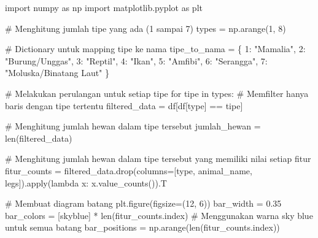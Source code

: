 \documentclass[
  letterpaper,
]{krantz}
\makeatletter
\newenvironment{Shaded}{\begin{snugshade}}{\end{snugshade}}
\newcommand{\BuiltInTok}[1]{\textcolor[rgb]{0.00,0.23,0.31}{#1}}
\newcommand{\CommentTok}[1]{\textcolor[rgb]{0.37,0.37,0.37}{#1}}
\newcommand{\ControlFlowTok}[1]{\textcolor[rgb]{0.00,0.23,0.31}{#1}}
\newcommand{\DecValTok}[1]{\textcolor[rgb]{0.68,0.00,0.00}{#1}}
\newcommand{\FloatTok}[1]{\textcolor[rgb]{0.68,0.00,0.00}{#1}}
\newcommand{\ImportTok}[1]{\textcolor[rgb]{0.00,0.46,0.62}{#1}}
\newcommand{\KeywordTok}[1]{\textcolor[rgb]{0.00,0.23,0.31}{#1}}
\newcommand{\NormalTok}[1]{\textcolor[rgb]{0.00,0.23,0.31}{#1}}
\newcommand{\OperatorTok}[1]{\textcolor[rgb]{0.37,0.37,0.37}{#1}}
\newcommand{\StringTok}[1]{\textcolor[rgb]{0.13,0.47,0.30}{#1}}
\newenvironment{kframe}{%
\medskip{}
\setlength{\fboxsep}{.8em}
 \def\at@end@of@kframe{}%
 \ifinner\ifhmode%
  \def\at@end@of@kframe{\end{minipage}}%
  \begin{minipage}{\columnwidth}%
 \fi\fi%
 \def\FrameCommand##1{\hskip\@totalleftmargin \hskip-\fboxsep
 \colorbox{shadecolor}{##1}\hskip-\fboxsep
     \hskip-\linewidth \hskip-\@totalleftmargin \hskip\columnwidth}%
 \MakeFramed {\advance\hsize-\width
   \@totalleftmargin\z@ \linewidth\hsize
   \@setminipage}}%
 {\par\unskip\endMakeFramed%
 \at@end@of@kframe}
\renewenvironment{Shaded}{\begin{kframe}}{\end{kframe}}
\makeatother
\begin{document}
\begin{Shaded}
\begin{Highlighting}[]
\ImportTok{import}\NormalTok{ numpy }\ImportTok{as}\NormalTok{ np}
\ImportTok{import}\NormalTok{ matplotlib.pyplot }\ImportTok{as}\NormalTok{ plt}

\CommentTok{\# Menghitung jumlah tipe yang ada (1 sampai 7)}
\NormalTok{types }\OperatorTok{=}\NormalTok{ np.arange(}\DecValTok{1}\NormalTok{, }\DecValTok{8}\NormalTok{)}

\CommentTok{\# Dictionary untuk mapping tipe ke nama}
\NormalTok{tipe\_to\_nama }\OperatorTok{=}\NormalTok{ \{}
    \DecValTok{1}\NormalTok{: }\StringTok{"Mamalia"}\NormalTok{,}
    \DecValTok{2}\NormalTok{: }\StringTok{"Burung/Unggas"}\NormalTok{,}
    \DecValTok{3}\NormalTok{: }\StringTok{"Reptil"}\NormalTok{,}
    \DecValTok{4}\NormalTok{: }\StringTok{"Ikan"}\NormalTok{,}
    \DecValTok{5}\NormalTok{: }\StringTok{"Amfibi"}\NormalTok{,}
    \DecValTok{6}\NormalTok{: }\StringTok{"Serangga"}\NormalTok{,}
    \DecValTok{7}\NormalTok{: }\StringTok{"Moluska/Binatang Laut"}
\NormalTok{\}}

\CommentTok{\# Melakukan perulangan untuk setiap tipe}
\ControlFlowTok{for}\NormalTok{ tipe }\KeywordTok{in}\NormalTok{ types:}
    \CommentTok{\# Memfilter hanya baris dengan tipe tertentu}
\NormalTok{    filtered\_data }\OperatorTok{=}\NormalTok{ df[df[}\StringTok{\textquotesingle{}type\textquotesingle{}}\NormalTok{] }\OperatorTok{==}\NormalTok{ tipe]}

    \CommentTok{\# Menghitung jumlah hewan dalam tipe tersebut}
\NormalTok{    jumlah\_hewan }\OperatorTok{=} \BuiltInTok{len}\NormalTok{(filtered\_data)}

    \CommentTok{\# Menghitung jumlah hewan dalam tipe tersebut yang memiliki nilai setiap fitur}
\NormalTok{    fitur\_counts }\OperatorTok{=}\NormalTok{ filtered\_data.drop(columns}\OperatorTok{=}\NormalTok{[}\StringTok{\textquotesingle{}type\textquotesingle{}}\NormalTok{, }\StringTok{\textquotesingle{}animal\_name\textquotesingle{}}\NormalTok{, }\StringTok{\textquotesingle{}legs\textquotesingle{}}\NormalTok{]).}\BuiltInTok{apply}\NormalTok{(}\KeywordTok{lambda}\NormalTok{ x: x.value\_counts()).T}

    \CommentTok{\# Membuat diagram batang}
\NormalTok{    plt.figure(figsize}\OperatorTok{=}\NormalTok{(}\DecValTok{12}\NormalTok{, }\DecValTok{6}\NormalTok{))}
\NormalTok{    bar\_width }\OperatorTok{=} \FloatTok{0.35}
\NormalTok{    bar\_colors }\OperatorTok{=}\NormalTok{ [}\StringTok{\textquotesingle{}skyblue\textquotesingle{}}\NormalTok{] }\OperatorTok{*} \BuiltInTok{len}\NormalTok{(fitur\_counts.index)  }\CommentTok{\# Menggunakan warna sky blue untuk semua batang}
\NormalTok{    bar\_positions }\OperatorTok{=}\NormalTok{ np.arange(}\BuiltInTok{len}\NormalTok{(fitur\_counts.index))}


\end{Highlighting}
\end{Shaded}
\end{document}
